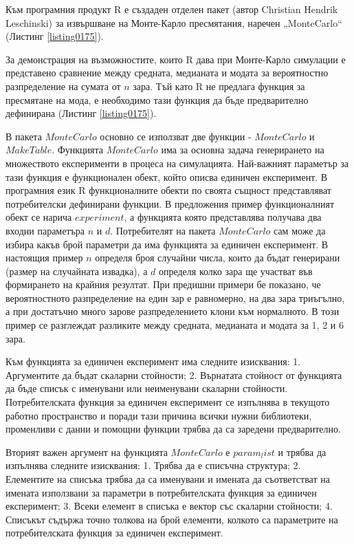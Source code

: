 Към програмния продукт R е създаден отделен пакет (автор Christian Hendrik Leschinski) за извършване на Монте-Карло пресмятания, наречен „MonteCarlo“ (Листинг \ref{listing0175}). 

За демонстрация на възможностите, които R дава при Монте-Карло симулации е представено сравнение между средната, медианата и модата за вероятностно разпределение на сумата от $n$ зара. Тъй като R не предлага функция за пресмятане на мода, е необходимо тази функция да бъде предварително дефинирана (Листинг \ref{listing0175}).

В пакета $MonteCarlo$ основно се използват две функции - $MonteCarlo$ и $MakeTable$. Функцията $MonteCarlo$ има за основна задача генерирането на множеството експерименти в процеса на симулацията. Най-важният параметър за тази функция е функционален обект, който описва единичен експеримент. В програмния език R функционалните обекти по своята същност представляват потребителски дефинирани функции. В предложения пример функционалният обект се нарича $experiment$, а функцията която представлява получава два входни параметъра $n$ и $d$. Потребителят на пакета $MonteCarlo$ сам може да избира какъв брой параметри да има функцията за единичен експеримент. В настоящия пример $n$ определя броя случайни числа, които да бъдат генерирани (размер на случайната извадка), а $d$ определя колко зара ще участват във формирането на крайния резултат. При предишни примери бе показано, че вероятностното разпределение на един зар е равномерно, на два зара триъгълно, а при достатъчно много зарове разпределението клони към нормалното. В този пример се разглеждат разликите между средната, медианата и модата за 1, 2 и 6 зара.

Към функцията за единичен експеримент има следните изисквания: 1. Аргументите да бъдат скаларни стойности; 2. Върнатата стойност от функцията да бъде списък с именувани или неименувани скаларни стойности. Потребителската функция за единичен експеримент се изпълнява в текущото работно пространство и поради тази причина всички нужни библиотеки, променливи с данни и помощни функции трябва да са заредени предварително. 

Вторият важен аргумент на функцията $MonteCarlo$ е $param_list$ и трябва да изпълнява следните изисквания: 1. Трябва да е списъчна структура; 2. Елементите на списъка трябва да са именувани и имената да съответстват на имената използвани за параметри в потребителската функция за единичен експеримент; 3. Всеки елемент в списъка е вектор със скаларни стойности; 4. Списъкът съдържа точно толкова на брой елементи, колкото са параметрите на потребителската функция за единичен експеримент. 

